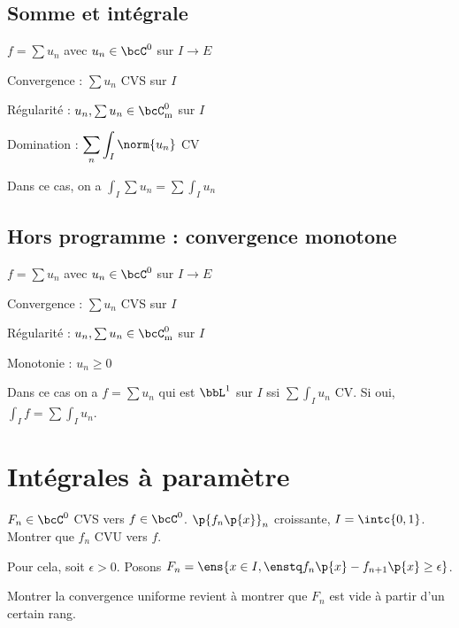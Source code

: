 \documentclass[a4paper,french,bookmarks]{book}
\begin{document}
    \subsection{Somme et intégrale}
    
    $f = \sum u_n$ avec $u_n \in \bcC^0$ sur $I \to E$
    
    \begin{itemize}
        \itt Convergence : $\sum u_n$ CVS sur $I$
        
        \itt Régularité : $u_n, \sum u_n \in \bcC^0_\text m$ sur $I$
        
        \itt Domination : $\displaystyle\sum_n \int_I \norm{u_n}$ CV
    \end{itemize}
    
    Dans ce cas, on a $\displaystyle \int_I \sum u_n = \sum \int_I u_n$
    
    \subsection{Hors programme : convergence monotone}
    
    $f = \sum u_n$ avec $u_n \in \bcC^0$ sur $I \to E$
    
    \begin{itemize}
        \itt Convergence : $\sum u_n$ CVS sur $I$
        
        \itt Régularité : $u_n, \sum u_n \in \bcC^0_\text m$ sur $I$
        
        \itt Monotonie : $u_n \geq 0$
    \end{itemize}
    
    Dans ce cas on a $f = \sum u_n$ qui est $\bbL^1$ sur $I$ ssi $\displaystyle \sum\int_I u_n$ CV. Si oui, $\displaystyle\int_I f = \sum \int_I u_n$.
    
    
    \section{Intégrales à paramètre}
    
    \newpage
    
    \begin{exercise}{}{}
        $F_n \in \bcC^0$ CVS vers $f \in \bcC^0$. $\p{f_n\p{x}}_n$ croissante, $I = \intc{0, 1}$. Montrer que $f_n$ CVU vers $f$.
        
        Pour cela, soit $\epsilon > 0$. Posons $F_n = \ens{x \in I, \enstq f_n\p{x} - f_{n+1}\p{x} \geq \epsilon}$.
        
        Montrer la convergence uniforme revient à montrer que $F_n$ est vide à partir d'un certain rang.
    \end{exercise}
    
\end{document}
